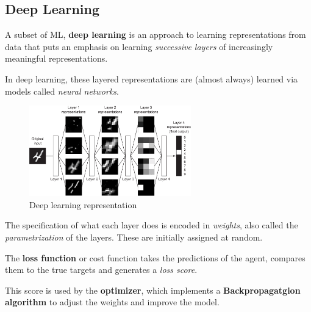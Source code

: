 \subsection{Deep Learning}

A subset of ML, \textbf{deep learning} is an approach to learning representations from data that puts an emphasis on learning \textit{successive layers} of increasingly meaningful representations.

In deep learning, these layered representations are (almost always) learned via models called \textit{neural networks}.

\begin{figure}[h]
    \centering
    \includegraphics[width=7cm]{dl}
    \caption{Deep learning representation}
    \label{fig:dl}
\end{figure}

The specification of what each layer does is encoded in \textit{weights}, also called the \textit{parametrization} of the layers. These are initially assigned at random.

The \textbf{loss function} or cost function takes the predictions of the agent, compares them to the true targets and generates a \textit{loss score}.

This score is used by the \textbf{optimizer}, which implements a \textbf{Backpropagatgion algorithm} to adjust the weights and improve the model.



